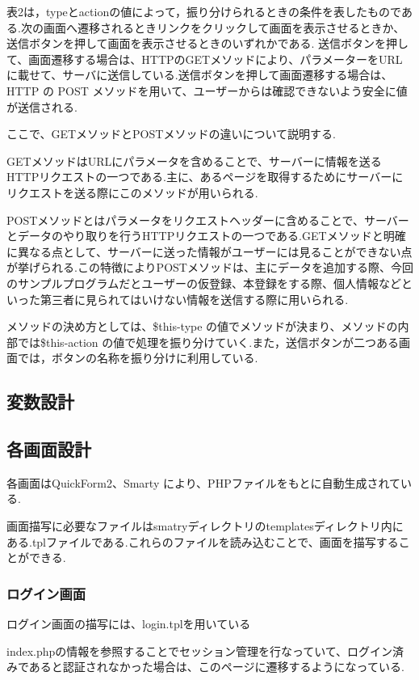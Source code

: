 \documentclass[submit,techrep]{ipsj}
\begin{document}
表2は，typeとactionの値によって，振り分けられるときの条件を表したものである.次の画面へ遷移されるときリンクをクリックして画面を表示させるときか、送信ボタンを押して画面を表示させるときのいずれかである. 送信ボタンを押して、画面遷移する場合は、HTTPのGETメソッドにより、パラメーターをURLに載せて、サーバに送信している.送信ボタンを押して画面遷移する場合は、HTTP の POST メソッドを用いて、ユーザーからは確認できないよう安全に値が送信される.

ここで、GETメソッドとPOSTメソッドの違いについて説明する.

GETメソッドはURLにパラメータを含めることで、サーバーに情報を送るHTTPリクエストの一つである.主に、あるページを取得するためにサーバーにリクエストを送る際にこのメソッドが用いられる.

POSTメソッドとはパラメータをリクエストヘッダーに含めることで、サーバーとデータのやり取りを行うHTTPリクエストの一つである.GETメソッドと明確に異なる点として、サーバーに送った情報がユーザーには見ることができない点が挙げられる.この特徴によりPOSTメソッドは、主にデータを追加する際、今回のサンプルプログラムだとユーザーの仮登録、本登録をする際、個人情報などといった第三者に見られてはいけない情報を送信する際に用いられる.

メソッドの決め方としては、\$this-\>type の値でメソッドが決まり、メソッドの内部では\$this-\>action の値で処理を振り分けていく.また，送信ボタンが二つある画面では，ボタンの名称を振り分けに利用している.

\subsection{変数設計}

\subsection{各画面設計}
各画面はQuickForm2、Smarty により、PHPファイルをもとに自動生成されている.

画面描写に必要なファイルはsmatryディレクトリのtemplatesディレクトリ内にある.tplファイルである.これらのファイルを読み込むことで、画面を描写することができる.

\subsubsection{ログイン画面}
ログイン画面の描写には、login.tplを用いている

index.phpの情報を参照することでセッション管理を行なっていて、ログイン済みであると認証されなかった場合は、このページに遷移するようになっている.
\end{document}
